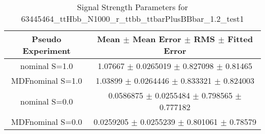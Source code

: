 \begin{table}
\centering
\caption{Signal Strength Parameters for 63445464\_ttHbb\_N1000\_r\_ttbb\_ttbarPlusBBbar\_1.2\_test1}
\begin{tabular}{cc}
\toprule
Pseudo Experiment & Mean $\pm$ Mean Error $\pm$ RMS $\pm$ Fitted Error\\
\midrule
nominal S=1.0 & \num{1.07667} $\pm$ \num{0.0265019} $\pm$ \num{0.827098} $\pm$ \num{0.81465}\\
MDFnominal S=1.0 & \num{1.03899} $\pm$ \num{0.0264446} $\pm$ \num{0.833321} $\pm$ \num{0.824003}\\
nominal S=0.0 & \num{0.0586875} $\pm$ \num{0.0255484} $\pm$ \num{0.798565} $\pm$ \num{0.777182}\\
MDFnominal S=0.0 & \num{0.0259205} $\pm$ \num{0.0255239} $\pm$ \num{0.801061} $\pm$ \num{0.78579}\\
\bottomrule
\end{tabular}
\end{table}